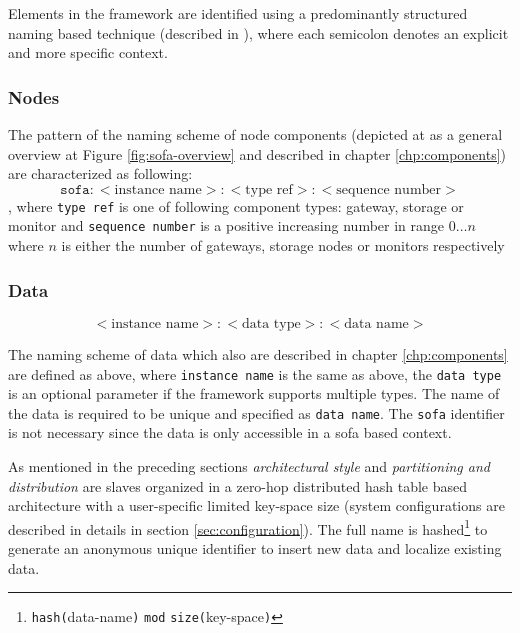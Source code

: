 Elements in the framework are identified using a predominantly structured naming based technique (described in \cite{Tanenbaum:2006:DSP:1202502}), where each semicolon denotes an explicit and more specific context. 

\subsubsection*{Nodes}
The pattern of the naming scheme of node components (depicted at as a general overview at Figure \ref{fig:sofa-overview} and described in chapter \ref{chp:components}) are characterized as following:
\vspace*{2mm}
\begin{equation*}
	\texttt{sofa}:<\text{instance name}>:<\text{type ref}>:<\text{sequence number}>
\end{equation*}
, where \texttt{type ref} is one of following component types: gateway, storage or monitor and \texttt{sequence number} is a positive increasing number in range $0\ldots n$ where $n$ is either the number of gateways, storage nodes or monitors respectively

\subsubsection*{Data}
\begin{equation*}
	<\text{instance name}>:<\text{data type}>:<\text{data name}>
\end{equation*}
\vspace*{1mm}

The naming scheme of data which also are described in chapter \ref{chp:components} are defined as above, where \texttt{instance name} is the same as above, the \texttt{data type} is an optional parameter if the framework supports multiple types. The name of the data is required to be unique and specified as \texttt{data name}. The \texttt{sofa} identifier is not necessary since the data is only accessible in a sofa based context.
\newline

As mentioned in the preceding sections \textit{architectural style} and \textit{partitioning and distribution} are slaves organized in a zero-hop distributed hash table based architecture with a user-specific limited key-space size (system configurations are described in details in section \ref{sec:configuration}). The full name is hashed\footnote{\texttt{hash(}data-name\texttt{)} \texttt{mod} \texttt{size(}key-space\texttt{)}} to generate an anonymous unique identifier to insert new data and localize existing data.


